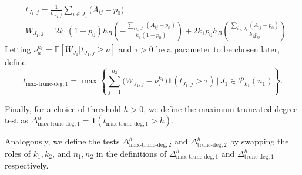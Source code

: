 \documentclass{article}
\newcommand{\one}{\mathbf{1}}
\newcommand{\chisqlin}{\text{trunc-deg}}
\newcommand{\chisqmax}{\text{max-trunc-deg}}
\begin{document}
\begin{enumerate}
    \begin{align}
        &t_{J_1, j} = \frac{1}{\sigma_{J_1,j}}\sum_{i \in J_1}\big(A_{ij} - p_0\big)\nonumber\\
        &W_{J_1,j} = 2k_1(1-p_0)h_B\left(-\frac{\sum_{i\in J_1} (A_{ij}-p_0)}{k_1(1-p_0)}\right) + 2k_1 p_0 h_B\left(\frac{\sum_{i\in J_1} (A_{ij}-p_0)}{k_1 p_0}\right)\label{eq_def_max_trunc_deg}
    \end{align}
    Letting $\nu_a^{k_1} =  \mathbb 
    E\left[W_{J_1}| t_{J_1, j} \geq a\right]$ and $\tau > 0$ be a parameter to be chosen later, define
\begin{equation}\label{eq_def_maxchisq}
        t_{\chisqmax, 1} = \max \left\{\sum_{j = 1}^{n_2}\big(W_{J_1,j} - \nu^{k_1}_{\tau}\big)\one(t_{J_1, j} > \tau)\,\Big|\, J_1 \in \mathcal{P}_{k_1}(n_1)\right\}.
    \end{equation}
    
    
    Finally, for a choice of threshold $h > 0$, we define the maximum truncated degree test as $\Delta_{\chisqmax, 1}^h = \one(t_{\chisqmax, 1} > h)$. 
\end{enumerate}
Analogously, we define the tests $\Delta_{\chisqmax, 2}^h$ and $\Delta_{\chisqlin, 2}^h$ by swapping the roles of $k_1,k_2$, and $n_1,n_2$ in the definitions of $\Delta_{\chisqmax, 1}^h$ and $\Delta_{\chisqlin, 1}^h$ respectively.
\end{document}
